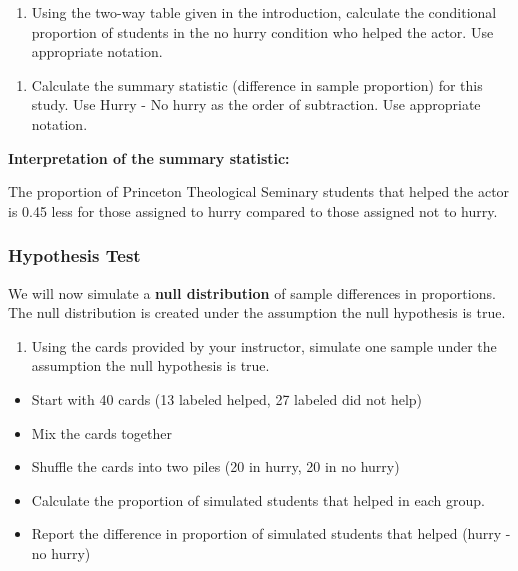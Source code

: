 \documentclass[
]{report}
\providecommand{\tightlist}{%
  \setlength{\itemsep}{0pt}\setlength{\parskip}{0pt}}
\begin{document}
\vspace{.3in}

\begin{enumerate}
\def\labelenumi{\arabic{enumi}.}
\setcounter{enumi}{1}
\tightlist
\item
  Using the two-way table given in the introduction, calculate the conditional proportion of students in the no hurry condition who helped the actor. Use appropriate notation.
\end{enumerate}

\vspace{.3in}

\begin{enumerate}
\def\labelenumi{\arabic{enumi}.}
\setcounter{enumi}{2}
\tightlist
\item
  Calculate the summary statistic (difference in sample proportion) for this study. Use Hurry - No hurry as the order of subtraction. Use appropriate notation.
\end{enumerate}

\vspace{0.5in}

\textbf{Interpretation of the summary statistic:}

The proportion of Princeton Theological Seminary students that helped the actor is 0.45 less for those assigned to hurry compared to those assigned not to hurry.

\subsubsection*{Hypothesis Test}\label{hypothesis-test-1}

We will now simulate a \textbf{null distribution} of sample differences in proportions. The null distribution is created under the assumption the null hypothesis is true.

\begin{enumerate}
\def\labelenumi{\arabic{enumi}.}
\setcounter{enumi}{3}
\tightlist
\item
  Using the cards provided by your instructor, simulate one sample under the assumption the null hypothesis is true.
\end{enumerate}

\begin{itemize}
\item
  Start with 40 cards (13 labeled helped, 27 labeled did not help)
\item
  Mix the cards together
\item
  Shuffle the cards into two piles (20 in hurry, 20 in no hurry)
\item
  Calculate the proportion of simulated students that helped in each group.
\item
  Report the difference in proportion of simulated students that helped (hurry - no hurry)
\end{itemize}
\end{document}
